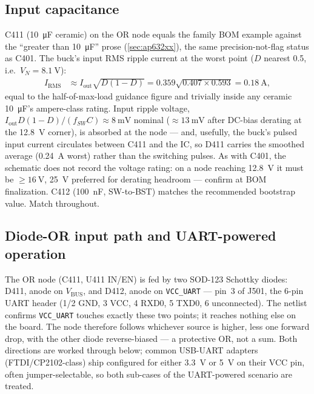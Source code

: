 \subsection{Input capacitance}\label{sec:3v3-cin}

C411 (\SI{10}{\micro\farad} ceramic) on the OR node equals the family BOM example
against the ``greater than \SI{10}{\micro\farad}'' prose (\cref{sec:ap632xx}), the same
precision-not-flag status as C401. The buck's input RMS ripple current at the worst
point ($D$ nearest 0.5, i.e.\ $V_N = \SI{8.1}{\volt}$):
\begin{align*}
  I_{\mathrm{RMS}} &\approx I_{\mathrm{out}}\sqrt{D(1-D)}
    = 0.359\sqrt{0.407\times0.593} = \SI{0.18}{\ampere},
\end{align*}
equal to the half-of-max-load guidance figure and trivially inside any ceramic
\SI{10}{\micro\farad}'s ampere-class rating. Input ripple voltage,
$I_{\mathrm{out}}D(1-D)/(f_{SW}C) \approx \SI{8}{\milli\volt}$ nominal
($\approx\SI{13}{\milli\volt}$ after DC-bias derating at the 12.8~V corner), is
absorbed at the node --- and, usefully, the buck's pulsed input current circulates
between C411 and the IC, so D411 carries the smoothed average
(\SI{0.24}{\ampere} worst) rather than the switching pulses. As with C401, the
schematic does not record the voltage rating: on a node reaching \SI{12.8}{\volt} it
must be $\geq\SI{16}{\volt}$, \SI{25}{\volt} preferred for derating headroom ---
confirm at BOM finalization. C412 (\SI{100}{\nano\farad}, SW-to-BST) matches the
recommended bootstrap value. Match throughout.

\subsection{Diode-OR input path and UART-powered operation}\label{sec:3v3-diodeor}

The OR node (C411, U411 IN/EN) is fed by two SOD-123 Schottky diodes: D411, anode on
$V_{\mathrm{BUS}}$, and D412, anode on \texttt{VCC\_UART} --- pin~3 of J501, the 6-pin
UART header (1/2 GND, 3 VCC, 4 RXD0, 5 TXD0, 6 unconnected). The netlist confirms
\texttt{VCC\_UART} touches exactly these two points; it reaches nothing else on the
board. The node therefore follows whichever source is higher, less one forward drop,
with the other diode reverse-biased --- a protective OR, not a sum. Both directions are
worked through below; common USB-UART adapters (FTDI/CP2102-class) ship configured for
either \SI{3.3}{\volt} or \SI{5}{\volt} on their VCC pin, often jumper-selectable, so
both sub-cases of the UART-powered scenario are treated.

